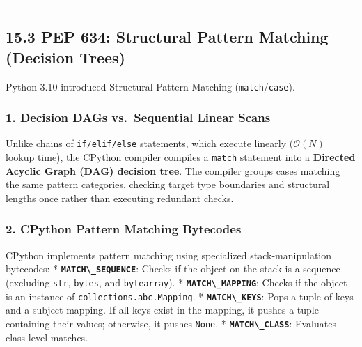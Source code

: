 \begin{center}\rule{0.5\linewidth}{0.5pt}\end{center}

\hypertarget{pep-634-structural-pattern-matching-decision-trees}{%
\subsection{15.3 PEP 634: Structural Pattern Matching (Decision
Trees)}\label{pep-634-structural-pattern-matching-decision-trees}}

Python 3.10 introduced Structural Pattern Matching
(\passthrough{\lstinline!match!}/\passthrough{\lstinline!case!}).

\hypertarget{decision-dags-vs.-sequential-linear-scans}{%
\subsubsection{1. Decision DAGs vs.~Sequential Linear
Scans}\label{decision-dags-vs.-sequential-linear-scans}}

Unlike chains of \passthrough{\lstinline!if/elif/else!} statements,
which execute linearly (\(\mathcal{O}(N)\) lookup time), the CPython
compiler compiles a \passthrough{\lstinline!match!} statement into a
\textbf{Directed Acyclic Graph (DAG) decision tree}. The compiler groups
cases matching the same pattern categories, checking target type
boundaries and structural lengths once rather than executing redundant
checks.

\hypertarget{cpython-pattern-matching-bytecodes}{%
\subsubsection{2. CPython Pattern Matching
Bytecodes}\label{cpython-pattern-matching-bytecodes}}

CPython implements pattern matching using specialized stack-manipulation
bytecodes: * \textbf{\passthrough{\lstinline!MATCH\_SEQUENCE!}}: Checks
if the object on the stack is a sequence (excluding
\passthrough{\lstinline!str!}, \passthrough{\lstinline!bytes!}, and
\passthrough{\lstinline!bytearray!}). *
\textbf{\passthrough{\lstinline!MATCH\_MAPPING!}}: Checks if the object
is an instance of \passthrough{\lstinline!collections.abc.Mapping!}. *
\textbf{\passthrough{\lstinline!MATCH\_KEYS!}}: Pops a tuple of keys and
a subject mapping. If all keys exist in the mapping, it pushes a tuple
containing their values; otherwise, it pushes
\passthrough{\lstinline!None!}. *
\textbf{\passthrough{\lstinline!MATCH\_CLASS!}}: Evaluates class-level
matches.


